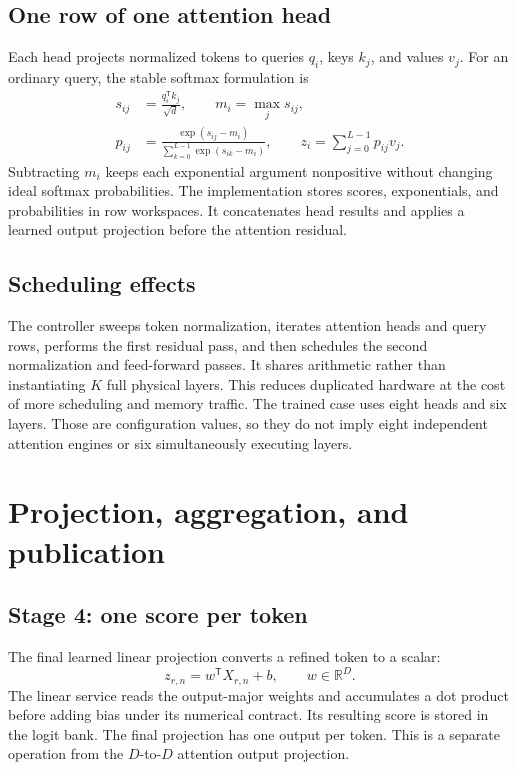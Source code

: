 \subsection{One row of one attention head}
Each head projects normalized tokens to queries \(q_i\), keys \(k_j\), and values \(v_j\). For an ordinary query, the stable softmax formulation is
\begin{align}
s_{ij} &= \frac{q_i^\mathsf{T}k_j}{\sqrt{d}},\qquad
m_i=\max_j s_{ij},\\
p_{ij} &= \frac{\exp(s_{ij}-m_i)}
                  {\sum_{k=0}^{L-1}\exp(s_{ik}-m_i)},\qquad
z_i=\sum_{j=0}^{L-1}p_{ij}v_j .
\end{align}
Subtracting \(m_i\) keeps each exponential argument nonpositive without changing ideal softmax probabilities. The implementation stores scores, exponentials, and probabilities in row workspaces. It concatenates head results and applies a learned output projection before the attention residual.


\subsection{Scheduling effects}
The controller sweeps token normalization, iterates attention heads and query rows, performs the first residual pass, and then schedules the second normalization and feed-forward passes. It shares arithmetic rather than instantiating \(K\) full physical layers. This reduces duplicated hardware at the cost of more scheduling and memory traffic. The trained case uses eight heads and six layers. Those are configuration values, so they do not imply eight independent attention engines or six simultaneously executing layers.
\clearpage

\section{Projection, aggregation, and publication}
\subsection{Stage 4: one score per token}
The final learned linear projection converts a refined token to a scalar:
\[
 z_{r,n}=w^\mathsf{T}X_{r,n}+b,\qquad w\in\mathbb R^D .
\]
The linear service reads the output-major weights and accumulates a dot product before adding bias under its numerical contract. Its resulting score is stored in the logit bank. The final projection has one output per token. This is a separate operation from the \(D\)-to-\(D\) attention output projection.


